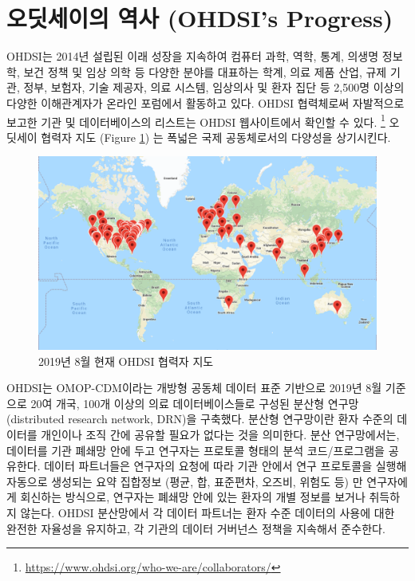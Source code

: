 \documentclass[11pt]{book}
\let\rmarkdownfootnote\footnote%
\def\footnote{\protect\rmarkdownfootnote}
\theoremstyle{definition}
\theoremstyle{definition}
\theoremstyle{definition}
\theoremstyle{remark}
\begin{document}

\section{오딧세이의 역사 (OHDSI's Progress)}\label{--ohdsis-progress}

OHDSI는 2014년 설립된 이래 성장을 지속하여 컴퓨터 과학, 역학, 통계,
의생명 정보학, 보건 정책 및 임상 의학 등 다양한 분야를 대표하는 학계,
의료 제품 산업, 규제 기관, 정부, 보험자, 기술 제공자, 의료 시스템,
임상의사 및 환자 집단 등 2,500명 이상의 다양한 이해관계자가 온라인
포럼에서 활동하고 있다. OHDSI 협력체로써 자발적으로 보고한 기관 및
데이터베이스의 리스트는 OHDSI 웹사이트에서 확인할 수 있다. \footnote{\url{https://www.ohdsi.org/who-we-are/collaborators/}}
오딧세이 협력자 지도 (Figure \ref{fig:collaboratormap}) 는 폭넓은 국제
공동체로서의 다양성을 상기시킨다.

\begin{figure}

{\centering \includegraphics[width=1\linewidth]{images/OhdsiCommunity/mapOfCollaborators} 

}

\caption{2019년 8월 현재 OHDSI 협력자 지도}\label{fig:collaboratormap}
\end{figure}

OHDSI는 OMOP-CDM이라는 개방형 공동체 데이터 표준 기반으로 2019년 8월
기준으로 20여 개국, 100개 이상의 의료 데이터베이스들로 구성된 분산형
연구망(distributed research network, DRN)을 구축했다. 분산형 연구망이란
환자 수준의 데이터를 개인이나 조직 간에 공유할 필요가 없다는 것을
의미한다. 분산 연구망에서는, 데이터를 기관 폐쇄망 안에 두고 연구자는
프로토콜 형태의 분석 코드/프로그램을 공유한다. 데이터 파트너들은
연구자의 요청에 따라 기관 안에서 연구 프로토콜을 실행해 자동으로
생성되는 요약 집합정보 (평균, 합, 표준편차, 오즈비, 위험도 등) 만
연구자에게 회신하는 방식으로, 연구자는 폐쇄망 안에 있는 환자의 개별
정보를 보거나 취득하지 않는다. OHDSI 분산망에서 각 데이터 파트너는 환자
수준 데이터의 사용에 대한 완전한 자율성을 유지하고, 각 기관의 데이터
거버넌스 정책을 지속해서 준수한다.
\end{document}
